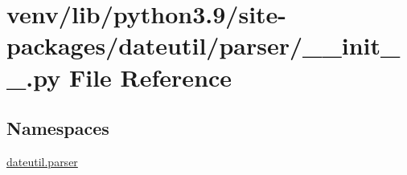 \hypertarget{venv_2lib_2python3_89_2site-packages_2dateutil_2parser_2____init_____8py}{}\section{venv/lib/python3.9/site-\/packages/dateutil/parser/\+\_\+\+\_\+init\+\_\+\+\_\+.py File Reference}
\label{venv_2lib_2python3_89_2site-packages_2dateutil_2parser_2____init_____8py}
\subsection*{Namespaces}
\begin{DoxyCompactItemize}
\item 
 \hyperlink{namespacedateutil_1_1parser}{dateutil.\+parser}
\end{DoxyCompactItemize}

